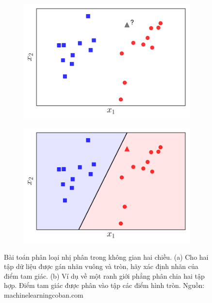 \documentclass{article}
\begin{document}
\begin{figure}[ht!]
    \centering
    \begin{subfigure}[b]{0.45\linewidth}
        \includegraphics[width = \linewidth]{pla1.pdf}
        \label{fig8a}
    \end{subfigure}
    \begin{subfigure}[b]{0.45\linewidth}
        \includegraphics[width = \linewidth]{pla2.pdf}
        \label{fig8b}
    \end{subfigure}
    \caption{Bài toán phân loại nhị phân trong không gian hai chiều. (a) Cho hai tập dữ liệu được gán nhãn vuông và tròn, hãy xác định nhãn của điểm tam giác. (b) Ví dụ về một ranh giới phẳng phân chia hai tập hợp. Điểm tam giác được phân vào tập các điểm hình tròn. Nguồn: machinelearningcoban.com}
    \label{fig8}
\end{figure}
\end{document}
